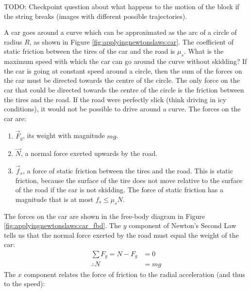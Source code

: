 TODO: Checkpoint question about what happens to the motion of the block if the string breaks (images with different possible trajectories). 

\begin{example}{\label{ex:applyingnewtonslaws:car}
A car goes around a curve which can be approximated as the arc of a circle of radius $R$, as shown in Figure \ref{fig:applyingnewtonslaws:car}. The coefficient of static friction between the tires of the car and the road is $\mu_s$. What is the maximum speed with which the car can go around the curve without skidding?
}
If the car is going at constant speed around a circle, then the sum of the forces on the car must be directed towards the centre of the circle. The only force on the car that could be directed towards the centre of the circle is the friction between the tires and the road. If the road were perfectly slick (think driving in icy conditions), it would not be possible to drive around a curve. The forces on the car are:
\begin{enumerate}
\item $\vec F_g$, its weight with magnitude $mg$.
\item $\vec N$, a normal force exerted upwards by the road.
\item $\vec f_s$, a force of static friction between the tires and the road. This is static friction, because the surface of the tire does not move relative to the surface of the road if the car is not skidding. The force of static friction has a magnitude that is at most $f_s\leq\mu_sN$.
\end{enumerate}
The forces on the car are shown in the free-body diagram in Figure \ref{fig:applyingnewtonslaws:car_fbd}.
The $y$ component of Newton's Second Law tells us that the normal force exerted by the road must equal the weight of the car:
\begin{align*}
\sum F_y = N-F_g&=0\\
\therefore N &=mg
\end{align*}
The $x$ component relates the force of friction to the radial acceleration (and thus to the speed):
\begin{align*}

\end{align*}
\end{example}
